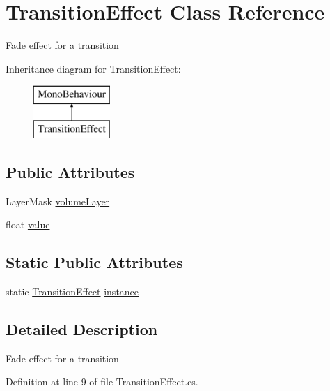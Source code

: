 \hypertarget{class_transition_effect}{}\section{Transition\+Effect Class Reference}
\label{class_transition_effect}


Fade effect for a transition  


Inheritance diagram for Transition\+Effect\+:\begin{figure}[H]
\begin{center}
\leavevmode
\includegraphics[height=2.000000cm]{class_transition_effect}
\end{center}
\end{figure}
\subsection*{Public Attributes}
\begin{DoxyCompactItemize}
\item 
Layer\+Mask \mbox{\hyperlink{class_transition_effect_a7ff07fcdfaa8c25fcf118e0eb6a7cd3c}{volume\+Layer}}
\item 
float \mbox{\hyperlink{class_transition_effect_af7fc803c35993244ecdcfd9093deeee0}{value}}
\end{DoxyCompactItemize}
\subsection*{Static Public Attributes}
\begin{DoxyCompactItemize}
\item 
static \mbox{\hyperlink{class_transition_effect}{Transition\+Effect}} \mbox{\hyperlink{class_transition_effect_af0621c8a766eacce2d6159869ebf35b6}{instance}}
\end{DoxyCompactItemize}


\subsection{Detailed Description}
Fade effect for a transition 



Definition at line 9 of file Transition\+Effect.\+cs.



